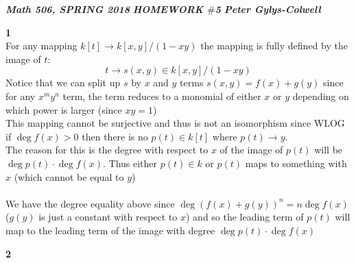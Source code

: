 \documentclass[12pt]{article}
\newenvironment{ques}[1]{\textbf{#1}\vspace{1 mm}\\ }{\bigskip}
\theoremstyle{definition}
\begin{document}
\noindent \textit{\textbf{Math 506, SPRING 2018}} \hspace{1.3cm}
\textit{\textbf{HOMEWORK $\#$5}} \hspace{1.3cm} \textit{\textbf{Peter
Gylys-Colwell}} 

\vspace{1cm}

\begin{ques}{1}
	For any mapping $k[t] \to k[x,y]/(1-xy)$ the mapping is fully defined by
	the image of $t$:
	$$t \to s(x,y) \in k[x,y]/(1-xy)$$
	Notice that we can  split up $s$ by $x$ and $y$ terms $s(x,y) = f(x) +
	g(y)$ since for any $x^my^n$ term, the term reduces to a
	monomial of either $x$ or $y$ depending on which power is larger (since $xy = 1$)\\
	This mapping cannot be surjective and thus is not an isomorphism since WLOG
	if $\deg f(x) > 0$ then there is no $p(t) \in k[t]$ where $p(t) \to y$.\\
	The reason for this is the degree with respect to $x$ of the image of
	$p(t)$ will be $\deg p(t) \cdot \deg f(x)$. Thus either $p(t) \in k$ or
	$p(t)$ maps to something with $x$ (which cannot be equal to $y$)\\
	\\
	We have the degree equality above since $\deg (f(x) + g(y))^n = n
	\deg f(x)$ ($g(y)$ is just a constant with respect to $x$) and so the
	leading term of $p(t)$ will map to the leading term of the image with
	degree $\deg p(t) \cdot \deg f(x)$
\end{ques}

\begin{ques}{2}
\end{ques}
\end{document}
